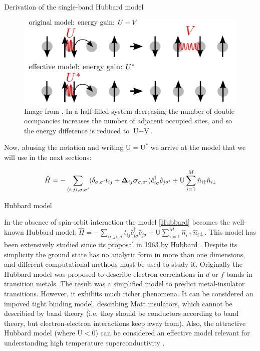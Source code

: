 \begin{section}{Derivation of the single-band Hubbard model}
\begin{figure}
\centering
  \includegraphics[width=0.5\linewidth]{../Figures/non_local_coulomb.png}
  \caption{Image from \cite{Schuler2013}. In a half-filled system decreasing the number of double occupancies increases the number of adjacent occupied sites, and so the energy difference is reduced to $\text{U}-\text{V}$.} 
\label{Fig2.1}
\end{figure}

Now, abusing the notation and writing $\text{U} = \text{U}^*$ we arrive at the model that we will use in the next sections:

\begin{equation}
\label{Hubbard}
\hat{H} = -\sum_{\langle i,j \rangle, \sigma, \sigma'}(\delta_{\sigma, \sigma'} t_{ij} + \boldsymbol{\Delta}_{ij} \boldsymbol{\sigma}_{\sigma, \sigma'})\hat{c}_{i \sigma}^\dagger \hat{c}_{j \sigma'} + \text{U} \sum_{i=1}^M \hat{n}_{i\uparrow}\hat{n}_{i\downarrow}
\end{equation}

\begin{subsection}{Hubbard model}

In the absence of spin-orbit interaction the model \ref{Hubbard} becomes the well-known Hubbard model: $\hat{H} = -\sum_{\langle i,j \rangle, \sigma} t_{ij} \hat{c}_{i \sigma}^\dagger \hat{c}_{j \sigma} + \text{U} \sum_{i=1}^M \hat{n}_{i\uparrow}\hat{n}_{i\downarrow}$. This model has been extensively studied since its proposal in 1963 by Hubbard \cite{Hubbard1963}. Despite its simplicity the ground state has no analytic form in more than one dimensions, and different computational methods must be used to study it. Originally the Hubbard model was proposed to describe electron correlations in $d$ or $f$ bands in transition metals. The result was a simplified model to predict metal-insulator transitions. However, it exhibits much richer phenomena. It can be considered an impoved tight binding model, describing Mott insulators, which cannot be describied by band theory (i.e. they should be conductors according to band theory, but electron-electron interactions keep away from). Also, the attractive Hubbard model (where $\text{U} < 0$) can be considered an effective model relevant for understanding high temperature superconductivity \cite{Alexandrov1981}.

\end{subsection}

\end{section}

